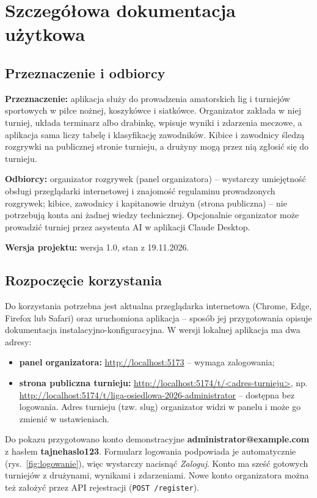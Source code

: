 \documentclass[11pt,a4paper,oneside]{article}
\newif\ifpodpowiedzi
\newcommand{\podpowiedz}[1]{\ifpodpowiedzi\par\begingroup\small\color{hintcolor}\textit{Wskazówka: #1}\par\endgroup\fi}
\begin{document}
\section{Szczegółowa dokumentacja użytkowa}
\subsection{Przeznaczenie i odbiorcy}
\podpowiedz{Wyjaśnij, do czego służy rozwiązanie, kto może z niego korzystać i jakie zadania umożliwia. Podaj wersję projektu, której dotyczy instrukcja. Używaj języka zrozumiałego dla wskazanego odbiorcy.}
\textbf{Przeznaczenie:} aplikacja służy do prowadzenia amatorskich lig i turniejów sportowych w piłce nożnej, koszykówce i siatkówce. Organizator zakłada w niej turniej, układa terminarz albo drabinkę, wpisuje wyniki i zdarzenia meczowe, a aplikacja sama liczy tabelę i klasyfikację zawodników. Kibice i zawodnicy śledzą rozgrywki na publicznej stronie turnieju, a drużyny mogą przez nią zgłosić się do turnieju.\par
\textbf{Odbiorcy:} organizator rozgrywek (panel organizatora) -- wystarczy umiejętność obsługi przeglądarki internetowej i znajomość regulaminu prowadzonych rozgrywek; kibice, zawodnicy i kapitanowie drużyn (strona publiczna) -- nie potrzebują konta ani żadnej wiedzy technicznej. Opcjonalnie organizator może prowadzić turniej przez asystenta AI w aplikacji Claude Desktop.\par
\textbf{Wersja projektu:} wersja 1.0, stan z 19.11.2026.

\subsection{Rozpoczęcie korzystania}
\podpowiedz{Podaj wymagania istotne dla użytkownika i sposób rozpoczęcia pracy: adres aplikacji, uruchamiany plik, odtwarzacz, urządzenie lub punkt wejścia do biblioteki. Wskaż potrzebne konto, uprawnienia i dane wejściowe, jeśli występują. Odwołaj się do dokumentacji instalacyjnej, jeśli jest wymagana; nie opisuj środowiska deweloperskiego.}
Do korzystania potrzebna jest aktualna przeglądarka internetowa (Chrome, Edge, Firefox lub Safari) oraz uruchomiona aplikacja -- sposób jej przygotowania opisuje dokumentacja instalacyjno-konfiguracyjna. W wersji lokalnej aplikacja ma dwa adresy:
\begin{itemize}
\item \textbf{panel organizatora:} \url{http://localhost:5173} -- wymaga zalogowania;
\item \textbf{strona publiczna turnieju:} \url{http://localhost:5174/t/<adres-turnieju>}, np. \url{http://localhost:5174/t/liga-osiedlowa-2026-administrator} -- dostępna bez logowania. Adres turnieju (tzw. slug) organizator widzi w panelu i może go zmienić w ustawieniach.
\end{itemize}
Do pokazu przygotowano konto demonstracyjne \textbf{administrator@example.com} z hasłem \textbf{tajnehaslo123}. Formularz logowania podpowiada je automatycznie (rys.~\ref{fig:logowanie}), więc wystarczy nacisnąć \emph{Zaloguj}. Konto ma sześć gotowych turniejów z drużynami, wynikami i zdarzeniami. Nowe konto organizatora można też założyć przez API rejestracji (\texttt{POST /register}).
\end{document}
